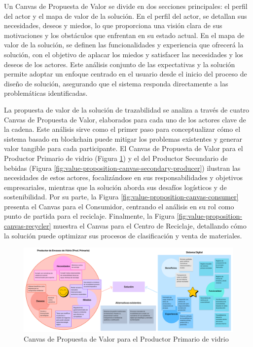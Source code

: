 Un Canvas de Propuesta de Valor se divide en dos secciones principales: el perfil del actor y el mapa de valor de la solución. En el perfil del actor, se detallan sus necesidades, deseos y miedos, lo que proporciona una visión clara de sus motivaciones y los obstáculos que enfrentan en su estado actual. En el mapa de valor de la solución, se definen las funcionalidades y experiencia que ofrecerá la solución, con el objetivo de aplacar los miedos y satisfacer las necesidades y los deseos de los actores. Este análisis conjunto de las expectativas y la solución permite adoptar un enfoque centrado en el usuario desde el inicio del proceso de diseño de solución, asegurando que el sistema responda directamente a las problemáticas identificadas.

La propuesta de valor de la solución de trazabilidad se analiza a través de cuatro Canvas de Propuesta de Valor, elaborados para cada uno de los actores clave de la cadena. Este análisis sirve como el primer paso para conceptualizar cómo el sistema basado en blockchain puede mitigar los problemas existentes y generar valor tangible para cada participante. El Canvas de Propuesta de Valor para el Productor Primario de vidrio (Figura \ref{fig:value-proposition-canvas-primary-producer}) y el del Productor Secundario de bebidas (Figura \ref{fig:value-proposition-canvas-secondary-producer}) ilustran las necesidades de estos actores, focalizándose en sus responsabilidades y objetivos empresariales, mientras que la solución aborda sus desafíos logísticos y de sostenibilidad. Por su parte, la Figura \ref{fig:value-proposition-canvas-consumer} presenta el Canvas para el Consumidor, centrando el análisis en su rol como punto de partida para el reciclaje. Finalmente, la Figura \ref{fig:value-proposition-canvas-recycler} muestra el Canvas para el Centro de Reciclaje, detallando cómo la solución puede optimizar sus procesos de clasificación y venta de materiales.

\begin{figure}[!htb]
    \centering
    \includegraphics[width=\textwidth]{Figures/value-proposition-canvas-primary-producer.png}
    \caption{Canvas de Propuesta de Valor para el Productor Primario de vidrio}
    \label{fig:value-proposition-canvas-primary-producer}
\end{figure}


